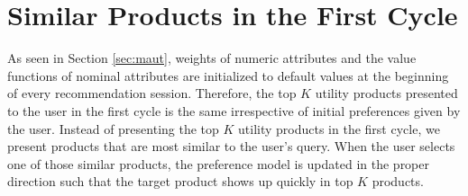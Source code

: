 \section{Similar Products in the First Cycle}
As seen in Section \ref{sec:maut}, weights of numeric attributes and the value functions of nominal attributes are initialized to default values at the beginning of every recommendation session.
Therefore, the top $K$ utility products presented to the user in the first cycle is the same irrespective of initial preferences given by the user.
Instead of presenting the top $K$ utility products in the first cycle, we present products that are most similar to the user's query.
When the user selects one of those similar products, the preference model is updated in the proper direction such that the target product shows up quickly in top $K$ products.
